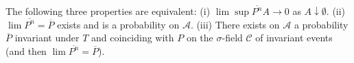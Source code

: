 The following three properties are equivalent: (i) $\lim \sup \overline{P^n} A \to 0$ as $A \downarrow \emptyset$. (ii) $\lim \overline{P^n} = \overline{P}$ exists and is a probability on $\mathcal{A}$. (iii) There exists on $\mathcal{A}$ a probability $\overline{P}$ invariant under $T$ and coinciding with $P$ on the $\sigma$-field $\mathcal{C}$ of invariant events (and then $\lim \overline{P^n} = \overline{P}$).
